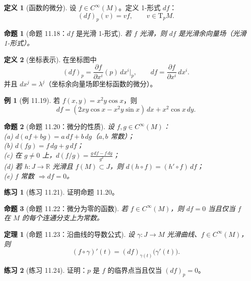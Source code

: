 \documentclass[12pt,a4paper]{article}
\theoremstyle{definition}
\newtheorem{definition}{定义}[section]
\newtheorem{example}{例}[section]
\newtheorem{exercise}{练习}[section]
\theoremstyle{plain}
\newtheorem{theorem}{定理}[section]
\newtheorem{proposition}{命题}[section]
\newcommand{\R}{\mathbb{R}}
\newcommand{\Cinf}{C^{\infty}}
\newcommand{\Tp}[1]{\mathrm{T}_{#1}}
\begin{document}
\begin{definition}[函数的微分]
设 $f\in \Cinf(M)$。定义 1-形式 $df$：
\[
(df)_p(v)=vf,\qquad v\in \Tp{p}M.
\]
\end{definition}

\begin{proposition}[命题 11.18：$df$ 是光滑 1-形式]
若 $f$ 光滑，则 $df$ 是光滑余向量场（光滑 1-形式）。
\end{proposition}

\begin{definition}[坐标表示]
在坐标图中
\[
(df)_p=\frac{\partial f}{\partial x^i}(p)\,dx^i|_p,\qquad
df=\frac{\partial f}{\partial x^i}\,dx^i.
\]
并且 $dx^j=\lambda^j$（坐标余向量场即坐标函数的微分）。
\end{definition}

\begin{example}[例 11.19]
若 $f(x,y)=x^2y\cos x$，则
\[
df=(2xy\cos x-x^2y\sin x)\,dx + x^2\cos x\,dy.
\]
\end{example}

\begin{proposition}[命题 11.20：微分的性质]
设 $f,g\in\Cinf(M)$：\\
(a) $d(af+bg)=a\,df+b\,dg$（$a,b$ 常数）；\\
(b) $d(fg)=f\,dg+g\,df$；\\
(c) 在 $g\neq 0$ 上，$d(f/g)=\frac{g\,df-f\,dg}{g^2}$；\\
(d) 若 $h:J\to\R$ 光滑且 $f(M)\subset J$，则 $d(h\circ f)=(h'\circ f)\,df$；\\
(e) $f$ 常数 $\Rightarrow df=0$。
\end{proposition}

\begin{exercise}[练习 11.21]
证明命题 11.20。
\end{exercise}

\begin{proposition}[命题 11.22：微分为零的函数]
若 $f\in\Cinf(M)$，则 $df=0$ 当且仅当 $f$ 在 $M$ 的每个连通分支上为常数。
\end{proposition}

\begin{theorem}[命题 11.23：沿曲线的导数公式]
设 $\gamma:J\to M$ 光滑曲线、$f\in\Cinf(M)$，则
\[
(f\circ\gamma)'(t)=(df)_{\gamma(t)}\big(\gamma'(t)\big).
\]
\end{theorem}

\begin{exercise}[练习 11.24]
证明：$p$ 是 $f$ 的临界点当且仅当 $(df)_p=0$。
\end{exercise}
\end{document}
